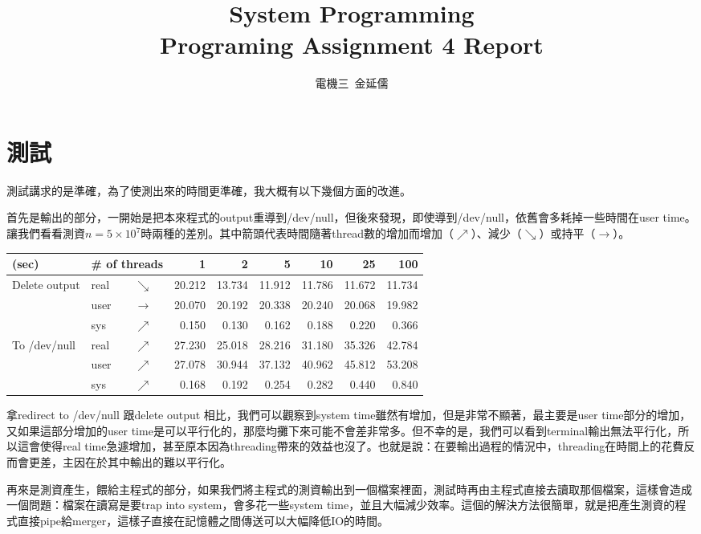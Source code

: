 \documentclass[12pt, a4paper]{article}
\title{System Programming\\Programing Assignment 4 Report}
\author{電機三\ 金延儒}
\begin{document}
\maketitle
\section{測試}
測試講求的是準確，為了使測出來的時間更準確，我大概有以下幾個方面的改進。

首先是輸出的部分，一開始是把本來程式的output重導到/dev/null，但後來發現，即使導到/dev/null，依舊會多耗掉一些時間在user time。讓我們看看測資$n=5\times 10^7$時兩種的差別。其中箭頭代表時間隨著thread數的增加而增加（$\nearrow$）、減少（$\searrow$）或持平（$\rightarrow$）。

\begin{center}
\begin{tabular}{l | l l r r r r r r}
\hline
(sec)& \multicolumn{2}{|l}{\# of threads} & 1 & 2 & 5 & 10 & 25 & 100 \\ \hline
\multirow{3}{*}{Delete output}
& real & $\searrow$ & 20.212 & 13.734 & 11.912 & 11.786 & 11.672 & 11.734 \\ \cline{2-9}
& user & $\rightarrow$ & 20.070 & 20.192 & 20.338 & 20.240 & 20.068 & 19.982 \\ \cline{2-9}
& sys & $\nearrow$ & 0.150 & 0.130 & 0.162 & 0.188 & 0.220 & 0.366 \\ \hline\hline
\multirow{3}{*}{To /dev/null}
& real & $\nearrow$ & 27.230 & 25.018 & 28.216 & 31.180 & 35.326 & 42.784 \\ \cline{2-9}
& user & $\nearrow$ & 27.078 & 30.944 & 37.132 & 40.962 & 45.812 & 53.208 \\ \cline{2-9}
& sys & $\nearrow$ & 0.168 & 0.192 & 0.254 & 0.282 & 0.440 & 0.840 \\
\hline
\end{tabular}
\end{center}

拿redirect to /dev/null 跟delete output 相比，我們可以觀察到system time雖然有增加，但是非常不顯著，最主要是user time部分的增加，又如果這部分增加的user time是可以平行化的，那麼均攤下來可能不會差非常多。但不幸的是，我們可以看到terminal輸出無法平行化，所以這會使得real time急遽增加，甚至原本因為threading帶來的效益也沒了。也就是說：在要輸出過程的情況中，threading在時間上的花費反而會更差，主因在於其中輸出的難以平行化。

再來是測資產生，餵給主程式的部分，如果我們將主程式的測資輸出到一個檔案裡面，測試時再由主程式直接去讀取那個檔案，這樣會造成一個問題：檔案在讀寫是要trap into system，會多花一些system time，並且大幅減少效率。這個的解決方法很簡單，就是把產生測資的程式直接pipe給merger，這樣子直接在記憶體之間傳送可以大幅降低IO的時間。
\end{document}

